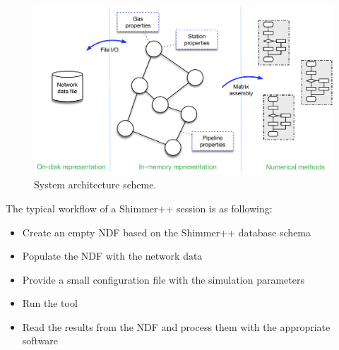 \begin{figure}[H]
    \centering
    \includegraphics[scale = 0.7]{img_intro/system_arch.pdf}  
    \caption{System architecture scheme.}
    \label{intro:architecture}
\end{figure}

The typical workflow of a Shimmer++ session is as following:
\begin{itemize}
    \item Create an empty NDF based on the Shimmer++ database schema
    \item Populate the NDF with the network data
    \item Provide a small configuration file with the simulation parameters
    \item Run the tool
    \item Read the results from the NDF and process them with the appropriate software
\end{itemize}
